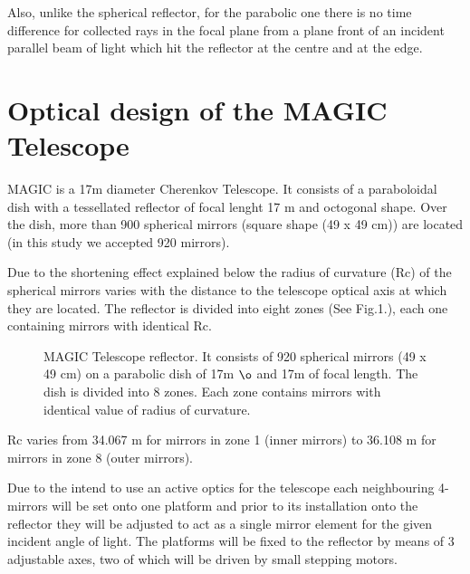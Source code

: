 Also, unlike the spherical reflector, for the parabolic one there is
no time difference for collected rays in the focal plane from a plane
front of an incident parallel beam of light which hit the reflector at
the centre and at the edge.

\section{Optical design of the MAGIC Telescope}

MAGIC is a 17m diameter Cherenkov Telescope.  It consists of a
paraboloidal dish with a tessellated reflector of focal lenght 17 m
and octogonal shape.  Over the dish, more than 900 spherical mirrors
(square shape (49 x 49 cm)) are located (in this study we accepted 920
mirrors).

Due to the shortening effect explained below the radius of curvature
(Rc) of the spherical mirrors varies with the distance to the
telescope optical axis at which they are located.  The reflector is
divided into eight zones (See Fig.1.), each one containing mirrors
with identical Rc.

\renewcommand{\textfraction}{0.1} 
\renewcommand{\bottomfraction}{0.9}
\renewcommand{\topfraction}{0.9}
\renewcommand{\floatpagefraction}{0.9}

\begin{figure}[h]\centering
  \leavevmode \epsfxsize=12cm
  \caption{\tiny{MAGIC Telescope reflector. It consists of 920 
      spherical mirrors (49 x 49 cm) on a parabolic dish of 17m $\o$
      and 17m of focal length. The dish is divided into 8 zones.  Each
      zone contains mirrors with identical value of radius of
      curvature.}}


\end{figure}  
Rc varies from 34.067 m for mirrors in zone 1 (inner mirrors) to
36.108 m for mirrors in zone 8 (outer mirrors).

Due to the intend to use an active optics for the telescope each
neighbouring 4-mirrors will be set onto one platform and prior to its
installation onto the reflector they will be adjusted to act as a
single mirror element for the given incident angle of light. The
platforms will be fixed to the reflector by means of 3 adjustable
axes, two of which will be driven by small stepping motors.



\vspace{1.0cm}

